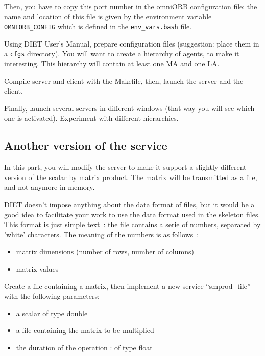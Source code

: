 \documentclass[11pt,a4paper]{article}
\begin{document}
Then, you have to copy this port number in the omniORB configuration file: the
name and location of this file is given by the environment variable 
\texttt{OMNIORB\_CONFIG} which is defined in the \texttt{env\_vars.bash} file.
\par

Using DIET User's Manual, prepare configuration files (suggestion: place
them in a \texttt{cfgs} directory). You will want to create a hierarchy of agents,
to make it interesting. This hierarchy will contain at least one MA and one LA.
\par

Compile server and client with the Makefile, then, launch the server and the
client. \par

Finally, launch several servers in different windows (that way you will see which
one is activated). Experiment with different hierarchies.


\subsection{Another version of the service}

In this part, you will modify the server to make it support a slightly different
version of the scalar by matrix product. The matrix will be transmitted as a
file, and not anymore in memory. \par

DIET doesn't impose anything about the data format of files, but it would be a
good idea to facilitate your work to use the data format used in the skeleton
files. This format is just simple text~: the file contains a serie of numbers,
separated by 'white' characters. The meaning of the numbers is as follows~:
\begin{itemize}
\item{matrix dimensions (number of rows, number of columns)}
\item{matrix values}
\end{itemize}

\par
Create a file containing a matrix, then implement a new service ``smprod\_file''
with the following parameters:
\begin{itemize}
\item{a scalar of type double}
\item{a file containing the matrix to be multiplied}
\item{the duration of the operation : of type float}
\end{itemize}
\end{document}
